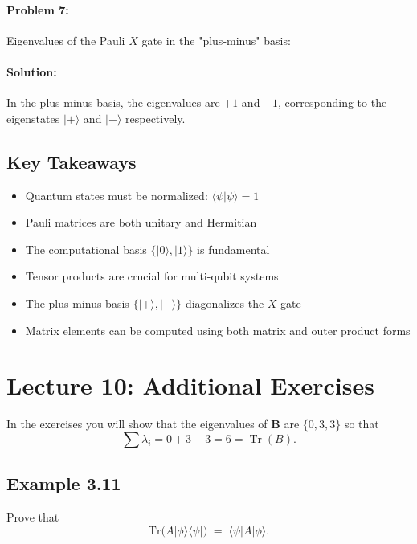 \documentclass{article}
\begin{document}
\paragraph{Problem 7:} Eigenvalues of the Pauli \( X \) gate in the "plus-minus" basis:

\paragraph{Solution:}
In the plus-minus basis, the eigenvalues are \( +1 \) and \( -1 \), corresponding to the eigenstates \( |+\rangle \) and \( |-\rangle \) respectively.

\subsection{Key Takeaways}
\begin{conceptbox}
\begin{itemize}
    \item Quantum states must be normalized: \( \langle \psi | \psi \rangle = 1 \)
    \item Pauli matrices are both unitary and Hermitian
    \item The computational basis \( \{|0\rangle, |1\rangle\} \) is fundamental
    \item Tensor products are crucial for multi-qubit systems
    \item The plus-minus basis \( \{|+\rangle, |-\rangle\} \) diagonalizes the \( X \) gate
    \item Matrix elements can be computed using both matrix and outer product forms
\end{itemize}
\end{conceptbox}

\newpage
\section{Lecture 10: Additional Exercises}
\label{sec:exercise}

In the exercises you will show that the eigenvalues of \(\mathbf{B}\) are \(\{0, 3, 3\}\) so that
\[
\sum \lambda_i = 0 + 3 + 3 = 6 = \operatorname{Tr}(B).
\]

\subsection*{Example 3.11}
Prove that
\[
\mathrm{Tr}\bigl(A \lvert\phi\rangle\langle\psi\rvert \bigr) \;=\; \langle\psi \lvert A \lvert\phi\rangle.
\]
\end{document}
